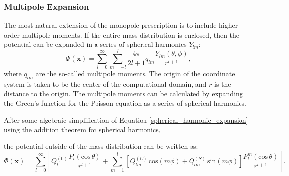 \documentclass[12pt,preprint]{aastex}
\begin{document}
\subsubsection{Multipole Expansion}

The most natural extension of the monopole prescription is to include higher-order multipole moments. If the entire mass distribution is enclosed, then the potential can be expanded in a series of spherical harmonics $Y_{lm}$:
\begin{equation}
  \Phi(\mathbf{x}) = \sum_{l=0}^{\infty}\sum_{m=-l}^{l} \frac{4\pi}{2l + 1} q_{lm} \frac{Y_{lm}(\theta,\phi)}{r^{l+1}}, \label{spherical_harmonic_expansion}
\end{equation}
where $q_{lm}$ are the so-called multipole moments. The origin of the coordinate system is taken to be the center of the computational domain, and $r$ is the distance to the origin. The multipole moments can be calculated by expanding the Green's function for the Poisson equation as a series of spherical harmonics.

After some algebraic simplification of Equation \ref{spherical_harmonic_expansion} using the addition theorem for spherical harmonics,

the potential outside of the mass distribution can be written as:
\begin{equation}
  \Phi(\mathbf{x}) = \sum_{l=0}^{\infty} \left[Q_l^{(0)} \frac{P_l(\text{cos}\, \theta)}{r^{l+1}} + \sum_{m = 1}^{l}\left[ Q_{lm}^{(C)}\, \text{cos}(m\phi) + Q_{lm}^{(S)}\, \text{sin}(m\phi)\right] \frac{P_{l}^{m}(\text{cos}\, \theta)}{r^{l+1}} \right].\label{multipole_potential}
\end{equation}
\end{document}
